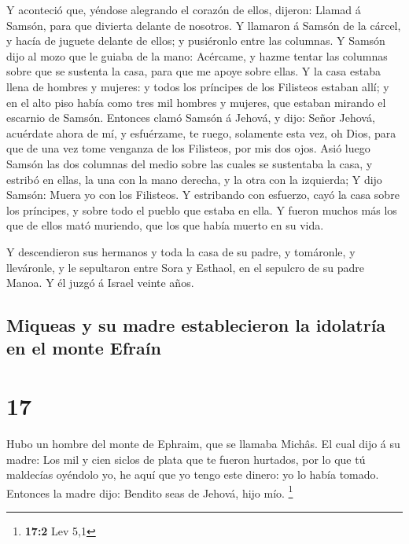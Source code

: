  Y aconteció que, yéndose alegrando el corazón de ellos,
dijeron: Llamad á Samsón, para que divierta delante de nosotros. Y
llamaron á Samsón de la cárcel, y hacía de juguete delante de ellos; y
pusiéronlo entre las columnas.  Y Samsón dijo al mozo que
le guiaba de la mano: Acércame, y hazme tentar las columnas sobre que se
sustenta la casa, para que me apoye sobre ellas.  Y la casa
estaba llena de hombres y mujeres: y todos los príncipes de los
Filisteos estaban allí; y en el alto piso había como tres mil hombres y
mujeres, que estaban mirando el escarnio de Samsón. 
Entonces clamó Samsón á Jehová, y dijo: Señor Jehová, acuérdate ahora de
mí, y esfuérzame, te ruego, solamente esta vez, oh Dios, para que de una
vez tome venganza de los Filisteos, por mis dos ojos.  Asió
luego Samsón las dos columnas del medio sobre las cuales se sustentaba
la casa, y estribó en ellas, la una con la mano derecha, y la otra con
la izquierda;  Y dijo Samsón: Muera yo con los Filisteos. Y
estribando con esfuerzo, cayó la casa sobre los príncipes, y sobre todo
el pueblo que estaba en ella. Y fueron muchos más los que de ellos mató
muriendo, que los que había muerto en su vida.

 Y descendieron sus hermanos y toda la casa de su padre, y
tomáronle, y lleváronle, y le sepultaron entre Sora y Esthaol, en el
sepulcro de su padre Manoa. Y él juzgó á Israel veinte años.

\hypertarget{miqueas-y-su-madre-establecieron-la-idolatruxeda-en-el-monte-efrauxedn}{%
\subsection{Miqueas y su madre establecieron la idolatría en el monte
Efraín}\label{miqueas-y-su-madre-establecieron-la-idolatruxeda-en-el-monte-efrauxedn}}

\hypertarget{section-16}{%
\section{17}\label{section-16}}

 Hubo un hombre del monte de Ephraim, que se llamaba Michâs.
 El cual dijo á su madre: Los mil y cien siclos de plata que
te fueron hurtados, por lo que tú maldecías oyéndolo yo, he aquí que yo
tengo este dinero: yo lo había tomado. Entonces la madre dijo: Bendito
seas de Jehová, hijo mío. \footnote{\textbf{17:2} Lev 5,1}

